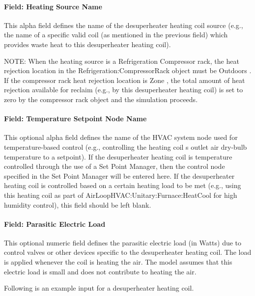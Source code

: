 \paragraph{Field: Heating Source Name}\label{field-heating-source-name}

This alpha field defines the name of the desuperheater heating coil source (e.g., the name of a specific valid coil (as mentioned in the previous field) which provides waste heat to this desuperheater heating coil).

NOTE: When the heating source is a Refrigeration Compressor rack, the heat rejection location in the Refrigeration:CompressorRack object must be Outdoors . If the compressor rack heat rejection location is Zone , the total amount of heat rejection available for reclaim (e.g., by this desuperheater heating coil) is set to zero by the compressor rack object and the simulation proceeds.

\paragraph{Field: Temperature Setpoint Node Name}\label{field-temperature-setpoint-node-name-3}

This optional alpha field defines the name of the HVAC system node used for temperature-based control (e.g., controlling the heating coil s outlet air dry-bulb temperature to a setpoint). If the desuperheater heating coil is temperature controlled through the use of a Set Point Manager, then the control node specified in the Set Point Manager will be entered here. If the desuperheater heating coil is controlled based on a certain heating load to be met (e.g., using this heating coil as part of AirLoopHVAC:Unitary:Furnace:HeatCool for high humidity control), this field should be left blank.

\paragraph{Field: Parasitic Electric Load}\label{field-parasitic-electric-load}

This optional numeric field defines the parasitic electric load (in Watts) due to control valves or other devices specific to the desuperheater heating coil. The load is applied whenever the coil is heating the air. The model assumes that this electric load is small and does not contribute to heating the air.

Following is an example input for a desuperheater heating coil.

